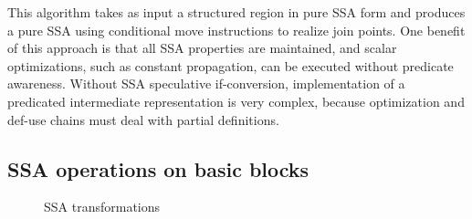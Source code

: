 This algorithm takes as input a structured region in pure SSA form and produces a pure SSA using conditional move instructions to realize join points. One benefit of this approach is that all SSA properties are maintained, and scalar optimizations, such as constant propagation, can be executed without predicate awareness. Without SSA speculative if-conversion, implementation of a predicated intermediate representation is very complex, because optimization and def-use chains must deal with partial definitions.

\subsection{SSA operations on basic blocks}

\begin{figure}[h]
\centering

\caption{SSA transformations}
\label{fig: phi_operations}
\end{figure}

